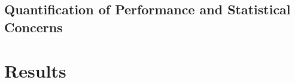 \documentclass{sig-alternate-05-2015}
\begin{document}



\subsection{Quantification of Performance and Statistical Concerns}
\label{sec:experimental_setup:perf_model_and_stats}


\section{Results}
\label{sec:results}
\end{document}
